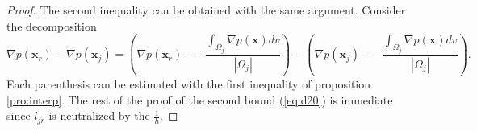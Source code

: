 \documentclass[a4paper,french,english,10pt]{article}
\newcommand\njr{\mathbf{n}_{jr}}
\begin{document}
\begin{proof}
The second inequality can be  obtained with the same argument.
Consider  the decomposition
$$
\nabla p (\mathbf x_r)-\nabla p (\mathbf x_j)=
\left( \nabla p (\mathbf x_r) - -\frac{\int_{\Omega_j }\nabla p (\mathbf x) dv}{|\Omega_j |} \right)
-\left( \nabla p (\mathbf x_j) - -\frac{\int_{\Omega_j }\nabla p (\mathbf x) dv}{|\Omega_j |} \right).
$$
Each parenthesis can be estimated with the first inequality
of proposition \ref{pro:interp}. The rest of the proof of the second
 bound (\ref{eq:d20}) is immediate since $l_{jr}$ is neutralized by the $\frac1h$.


\end{proof}
\end{document}
